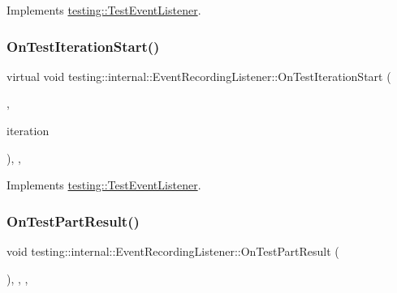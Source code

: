 Implements \mbox{\hyperlink{classtesting_1_1_test_event_listener_a60cc09b7907cb329d152eb5e7133bdeb}{testing\+::\+Test\+Event\+Listener}}.

\mbox{\label{classtesting_1_1internal_1_1_event_recording_listener_a0bfa276def9594b2a119c2c370f59281}} 
\subsubsection{\texorpdfstring{OnTestIterationStart()}{OnTestIterationStart()}\hspace{0.1cm}{\footnotesize\ttfamily [3/3]}}
{\footnotesize\ttfamily virtual void testing\+::internal\+::\+Event\+Recording\+Listener\+::\+On\+Test\+Iteration\+Start (\begin{DoxyParamCaption}\item[{const \mbox{\hyperlink{classtesting_1_1_unit_test}{Unit\+Test}} \&}]{,  }\item[{int}]{iteration }\end{DoxyParamCaption})\hspace{0.3cm}{\ttfamily [inline]}, {\ttfamily [protected]}, {\ttfamily [virtual]}}



Implements \mbox{\hyperlink{classtesting_1_1_test_event_listener_a60cc09b7907cb329d152eb5e7133bdeb}{testing\+::\+Test\+Event\+Listener}}.

\mbox{\label{classtesting_1_1internal_1_1_event_recording_listener_a9122b67d43420a41d1cfe9307809e078}} 
\subsubsection{\texorpdfstring{OnTestPartResult()}{OnTestPartResult()}\hspace{0.1cm}{\footnotesize\ttfamily [1/3]}}
{\footnotesize\ttfamily void testing\+::internal\+::\+Event\+Recording\+Listener\+::\+On\+Test\+Part\+Result (\begin{DoxyParamCaption}\item[{const Test\+Part\+Result \&}]{ }\end{DoxyParamCaption})\hspace{0.3cm}{\ttfamily [inline]}, {\ttfamily [override]}, {\ttfamily [protected]}, {\ttfamily [virtual]}}



